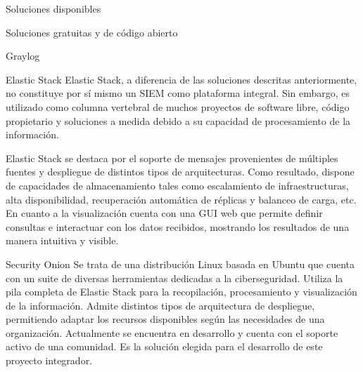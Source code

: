 \begin{section}{Soluciones disponibles}
\begin{subsection}{Soluciones gratuitas y de código abierto}
\begin{subsubsection}{Graylog}
            \end{subsubsection}
            \begin{subsubsection}{Elastic Stack}
            Elastic Stack\cite{elastic}, a diferencia de las soluciones descritas anteriormente, no constituye por sí mismo un SIEM como plataforma integral. Sin embargo, es utilizado como columna vertebral de muchos proyectos de software libre, código propietario y soluciones a medida debido a su capacidad de procesamiento de la información. \par
        	Elastic Stack se destaca por el soporte de mensajes provenientes de múltiples fuentes y despliegue de distintos tipos de arquitecturas. Como resultado, dispone de capacidades de almacenamiento tales como escalamiento de infraestructuras, alta disponibilidad, recuperación automática de réplicas y balanceo de carga, etc. En cuanto a la visualización cuenta con una GUI web que permite definir consultas e interactuar con los datos recibidos, mostrando los resultados de una manera intuitiva y visible. 

            \end{subsubsection}
            \begin{subsubsection}{Security Onion}
            Se trata de una distribución Linux basada en Ubuntu que cuenta con un suite de diversas herramientas dedicadas a la ciberseguridad. Utiliza la pila completa de Elastic Stack para la recopilación, procesamiento y visualización de la información. Admite distintos tipos de arquitectura de despliegue, permitiendo adaptar los recursos disponibles según las necesidades de una organización. Actualmente se encuentra en desarrollo y cuenta con el soporte activo de una comunidad. Es la solución elegida para el desarrollo de este proyecto integrador.
            \end{subsubsection}
            
        \end{subsection} 
    \end{section}
